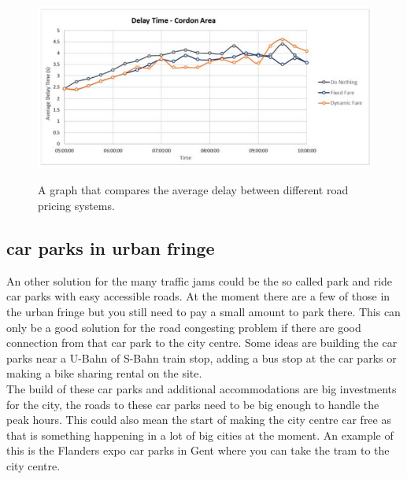 \begin{figure}[h!]
	\centering
	\includegraphics[width=0.55\textheight]{ProblemsFigures/dynamicRoadPricing}
	\label{fig:dynroad}
	\caption{A graph that compares the average delay between different road pricing systems. }
\end{figure}

\subsection{car parks in urban fringe} \label{subsec:parkin}
An other solution for the many traffic jams could be the so called park and ride car parks with easy accessible roads. At the moment there are a few of those in the urban fringe but you still need to pay a small amount to park there. This can only be a good solution for the road congesting problem if there are good connection from that car park to the city centre. Some ideas are building the car parks near a U-Bahn of S-Bahn train stop, adding a bus stop at the car parks or making a bike sharing rental on the site. \\ \newline 
The build of these car parks and additional accommodations are big investments for the city, the roads to these car parks need to be big enough to handle the peak hours. This could also mean the start of making the city centre car free as that is something happening in a lot of big cities at the moment. An example of this is the Flanders expo car parks in Gent where you can take the tram to the city centre. 

